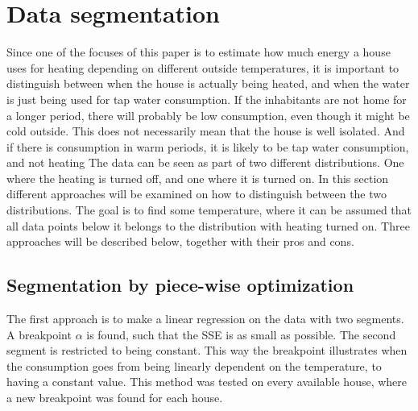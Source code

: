 \section{Data segmentation}
Since one of the focuses of this paper is to estimate how much energy a house uses for heating
depending on different outside temperatures, it is important to distinguish between when the house
is actually being heated, and when the water is just being used for tap water consumption. If the
inhabitants are not home for a longer period, there will probably be low consumption, even though
it might be cold outside. This does not necessarily mean that the house is well isolated. And if
there is consumption in warm periods, it is likely to be tap water consumption, and not heating
The data can be seen as part of two different distributions. One where the heating is turned off,
 and one where it is turned on. In this section different approaches will be examined on how to
 distinguish between the two distributions.
The goal is to find some temperature, where it can be assumed that all data points below it belongs
to the distribution with heating turned on. Three approaches will be described below, together with
their pros and cons.

\subsection{Segmentation by piece-wise optimization}
The first approach is to make a linear regression on the data with two segments. A breakpoint
$\alpha$ is found, such that the SSE is as small as possible. The second segment is restricted to
being constant. This way the breakpoint illustrates when the consumption goes from being linearly
dependent on the temperature, to having a constant value. This method was tested on every available
house, where a new breakpoint was found for each house.

